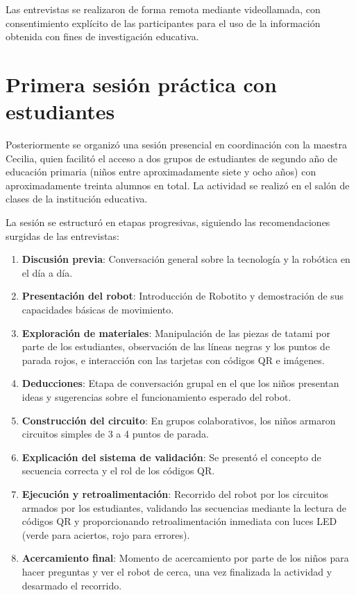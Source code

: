 \documentclass{prgrado}
\begin{document}
Las entrevistas se realizaron de forma remota mediante videollamada, con consentimiento explícito de las participantes para el uso de la información obtenida con fines de investigación educativa.

\section{Primera sesión práctica con estudiantes}
Posteriormente se organizó una sesión presencial en coordinación con la maestra Cecilia, quien facilitó el acceso a dos grupos de estudiantes de segundo año de educación primaria (niños entre aproximadamente siete y ocho años) con aproximadamente treinta alumnos en total. La actividad se realizó en el salón de clases de la institución educativa.

La sesión se estructuró en etapas progresivas, siguiendo las recomendaciones surgidas de las entrevistas:
\begin{enumerate}
\item \textbf{Discusión previa}: Conversación general sobre la tecnología y la robótica en el día a día.
\item \textbf{Presentación del robot}: Introducción de Robotito y demostración de sus capacidades básicas de movimiento.
\item \textbf{Exploración de materiales}: Manipulación de las piezas de tatami por parte de los estudiantes, observación de las líneas negras y los puntos de parada rojos, e interacción con las tarjetas con códigos QR e imágenes.
\item \textbf{Deducciones}: Etapa de conversación grupal en el que los niños presentan ideas y sugerencias sobre el funcionamiento esperado del robot.
\item \textbf{Construcción del circuito}: En grupos colaborativos, los niños armaron circuitos simples de 3 a 4 puntos de parada.
\item \textbf{Explicación del sistema de validación}: Se presentó el concepto de secuencia correcta y el rol de los códigos QR.
\item \textbf{Ejecución y retroalimentación}: Recorrido del robot por los circuitos armados por los estudiantes, validando las secuencias mediante la lectura de códigos QR y proporcionando retroalimentación inmediata con luces LED (verde para aciertos, rojo para errores).
\item \textbf{Acercamiento final}: Momento de acercamiento por parte de los niños para hacer preguntas y ver el robot de cerca, una vez finalizada la actividad y desarmado el recorrido.
\end{enumerate}
\end{document}
